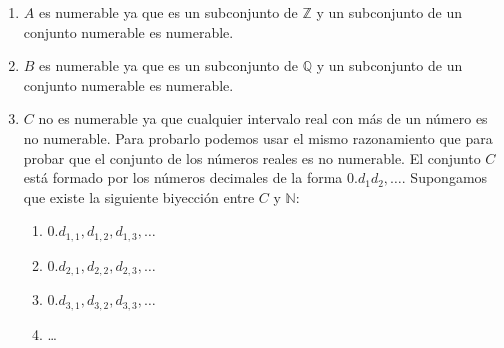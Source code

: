\documentclass[
  a4paper,
]{scrreport}
\providecommand{\tightlist}{%
  \setlength{\itemsep}{0pt}\setlength{\parskip}{0pt}}\usepackage{longtable,booktabs,array}
\theoremstyle{definition}
\theoremstyle{remark}
\begin{document}
\begin{tcolorbox}
\begin{tcolorbox}
\begin{tcolorbox}
\begin{tcolorbox}
\begin{tcolorbox}
\begin{tcolorbox}
\begin{tcolorbox}
\begin{tcolorbox}
\begin{tcolorbox}
\begin{tcolorbox}
\begin{tcolorbox}
\begin{tcolorbox}
\begin{tcolorbox}
\begin{tcolorbox}
\begin{tcolorbox}
\begin{tcolorbox}
\begin{tcolorbox}
\begin{tcolorbox}
\begin{tcolorbox}
\begin{tcolorbox}
\begin{tcolorbox}
\begin{tcolorbox}
\begin{tcolorbox}
\begin{tcolorbox}
\begin{tcolorbox}
\begin{tcolorbox}
\begin{tcolorbox}
\begin{tcolorbox}
\begin{tcolorbox}
\begin{tcolorbox}
\begin{tcolorbox}
\begin{tcolorbox}
\begin{tcolorbox}
\begin{tcolorbox}
\begin{tcolorbox}
\begin{tcolorbox}
\begin{tcolorbox}
\begin{tcolorbox}
\begin{tcolorbox}
\begin{tcolorbox}
\begin{tcolorbox}
\begin{tcolorbox}
\begin{tcolorbox}
\begin{tcolorbox}
\begin{tcolorbox}
\begin{tcolorbox}
\begin{tcolorbox}
\begin{enumerate}
\def\labelenumi{\alph{enumi}.}
\item
  \(A\) es numerable ya que es un subconjunto de \(\mathbb{Z}\) y un
  subconjunto de un conjunto numerable es numerable.
\item
  \(B\) es numerable ya que es un subconjunto de \(\mathbb{Q}\) y un
  subconjunto de un conjunto numerable es numerable.
\item
  \(C\) no es numerable ya que cualquier intervalo real con más de un
  número es no numerable. Para probarlo podemos usar el mismo
  razonamiento que para probar que el conjunto de los números reales es
  no numerable. El conjunto \(C\) está formado por los números decimales
  de la forma \(0.d_1d_2,\ldots\). Supongamos que existe la siguiente
  biyección entre \(C\) y \(\mathbb{N}\):

  \begin{enumerate}
  \def\labelenumii{\arabic{enumii}.}
  \tightlist
  \item
    \(0.d_{1,1},d_{1,2},d_{1,3},\ldots\)
  \item
    \(0.d_{2,1},d_{2,2},d_{2,3},\ldots\)
  \item
    \(0.d_{3,1},d_{3,2},d_{3,3},\ldots\)
  \item
    \ldots
  \end{enumerate}


\end{enumerate}
\end{tcolorbox}
\end{tcolorbox}
\end{tcolorbox}
\end{tcolorbox}
\end{tcolorbox}
\end{tcolorbox}
\end{tcolorbox}
\end{tcolorbox}
\end{tcolorbox}
\end{tcolorbox}
\end{tcolorbox}
\end{tcolorbox}
\end{tcolorbox}
\end{tcolorbox}
\end{tcolorbox}
\end{tcolorbox}
\end{tcolorbox}
\end{tcolorbox}
\end{tcolorbox}
\end{tcolorbox}
\end{tcolorbox}
\end{tcolorbox}
\end{tcolorbox}
\end{tcolorbox}
\end{tcolorbox}
\end{tcolorbox}
\end{tcolorbox}
\end{tcolorbox}
\end{tcolorbox}
\end{tcolorbox}
\end{tcolorbox}
\end{tcolorbox}
\end{tcolorbox}
\end{tcolorbox}
\end{tcolorbox}
\end{tcolorbox}
\end{tcolorbox}
\end{tcolorbox}
\end{tcolorbox}
\end{tcolorbox}
\end{tcolorbox}
\end{tcolorbox}
\end{tcolorbox}
\end{tcolorbox}
\end{tcolorbox}
\end{tcolorbox}
\end{tcolorbox}
\end{document}
